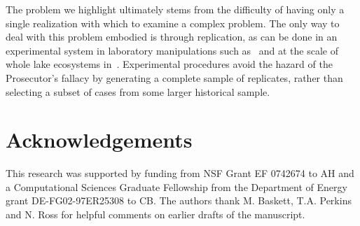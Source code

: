 The problem we highlight ultimately stems from the difficulty of having
only a single realization with which to examine a complex problem.
The only way to deal with this problem embodied is through replication, as
can be done in an experimental system in laboratory manipulations
such as~\citet{Drake2010, Veraart2011, Dai2012} and at the scale of whole lake
ecosystems in~\citet{Carpenter2011}.  
Experimental procedures avoid the hazard of the Prosecutor's fallacy by
generating a complete sample of replicates, rather than selecting a subset
of cases from some larger historical sample.  




 \section{Acknowledgements}
This research was supported by funding from NSF Grant EF 0742674 to AH
and a Computational Sciences Graduate Fellowship from the Department of
Energy grant DE-FG02-97ER25308 to CB. The authors thank M. Baskett, 
T.A. Perkins and N. Ross for helpful comments on earlier drafts of the
manuscript.  





